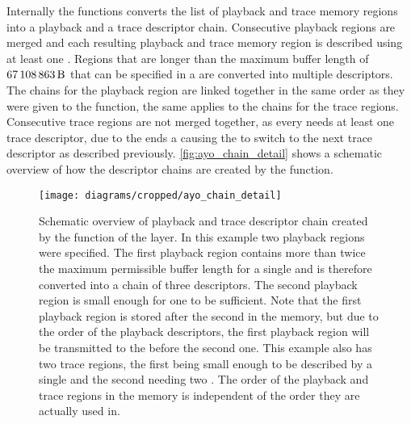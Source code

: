 Internally the  functions converts the list of playback and trace memory regions into a playback and a trace descriptor chain. Consecutive playback regions are merged and each resulting playback and trace memory region is described using at least one \descriptor{}. Regions that are longer than the maximum buffer length of $\SI{67108863}{\byte}$ that can be specified in a \descriptor{} are converted into multiple descriptors. The \descriptor{} chains for the playback region are linked together in the same order as they were given to the  function, the same applies to the \descriptor{} chains for the trace regions. Consecutive trace regions are not merged together, as every \PlaybackProgram{} needs at least one trace descriptor, due to the \haltInstr{} ends a \PlaybackProgram{} causing the \AXIDMA{} to switch to the next trace descriptor as described previously.
\autoref{fig:ayo_chain_detail} shows a schematic overview of how the descriptor chains are created by the  function.

\begin{figure}[htbp]
\centerline{\texttt{[image: diagrams/cropped/ayo\_chain\_detail]}}
\caption{Schematic overview of playback and trace descriptor chain created by the  function of the \ayo{} layer. In this example two playback regions were specified. The first playback region contains more than twice the maximum permissible buffer length for a single \descriptor{} and is therefore converted into a chain of three descriptors. The second playback region is small enough for one \descriptor{} to be sufficient. Note that the first playback region is stored after the second in the memory, but due to the order of the playback descriptors, the first playback region will be transmitted to the \pbexec{} before the second one. This example also has two trace regions, the first being small enough to be described by a single \descriptor{} and the second needing two \descriptor{}. The order of the playback and trace regions in the \DDR{} memory is independent of the order they are actually used in.}\label{fig:ayo_chain_detail}
\end{figure}

